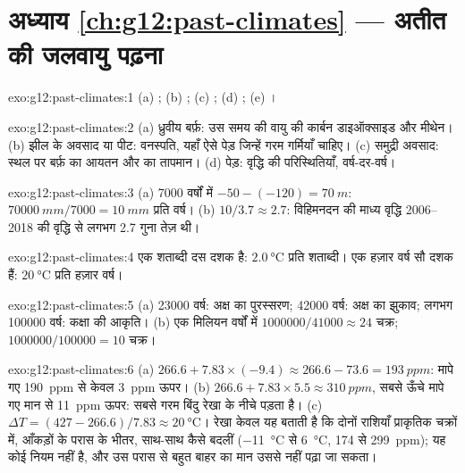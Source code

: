 \section*{अध्याय \ref{ch:g12:past-climates} --- अतीत की जलवायु पढ़ना}

\begin{solution}{exo:g12:past-climates:1}
(a) ; (b) ; (c) ; (d) ;
(e) ।
\end{solution}

\begin{solution}{exo:g12:past-climates:2}
(a) ध्रुवीय बर्फ़: उस समय की वायु की कार्बन डाइऑक्साइड और मीथेन।
(b) झील के अवसाद या पीट: वनस्पति, यहाँ ऐसे पेड़ जिन्हें गरम
गर्मियाँ चाहिए। (c) समुद्री अवसाद: स्थल पर बर्फ़ का आयतन और  का तापमान। (d) पेड़: वृद्धि की परिस्थितियाँ, वर्ष-दर-वर्ष।
\end{solution}

\begin{solution}{exo:g12:past-climates:3}
(a) \num{7000} वर्षों में $-50 - (-120) = \qty{70}{m}$: $\qty{70000}{mm}/\num{7000}
= \qty{10}{mm}$ प्रति वर्ष। (b) $10/3.7 \approx 2.7$: विहिमनदन की माध्य वृद्धि
2006--2018 की वृद्धि से लगभग 2.7 गुना तेज़ थी।
\end{solution}

\begin{solution}{exo:g12:past-climates:4}
एक शताब्दी दस दशक है: $\qty{2.0}{\degreeCelsius}$ प्रति शताब्दी। एक हज़ार
वर्ष सौ दशक हैं: $\qty{20}{\degreeCelsius}$ प्रति हज़ार वर्ष।
\end{solution}

\begin{solution}{exo:g12:past-climates:5}
(a) \num{23000} वर्ष: अक्ष का पुरस्सरण; \num{42000} वर्ष:
अक्ष का झुकाव; लगभग \num{100000} वर्ष: कक्षा की आकृति।
(b) एक मिलियन वर्षों में $\num{1000000}/\num{41000} \approx 24$ चक्र; $\num{1000000}/\num{100000}
= 10$ चक्र।
\end{solution}

\begin{solution}{exo:g12:past-climates:6}
(a) $266.6 + 7.83 \times (-9.4) \approx 266.6 - 73.6 = \qty{193}{ppm}$: मापे गए
\qty{190}{ppm} से केवल \qty{3}{ppm} ऊपर। (b) $266.6 + 7.83 \times 5.5
\approx \qty{310}{ppm}$, सबसे ऊँचे मापे गए मान से \qty{11}{ppm} ऊपर:
सबसे गरम बिंदु रेखा के नीचे पड़ता है। (c) $\Delta T = (427 - 266.6)/7.83 \approx
\qty{20}{\degreeCelsius}$। रेखा केवल यह बताती है कि दोनों राशियाँ प्राकृतिक चक्रों में,
आँकड़ों के परास के भीतर, साथ-साथ कैसे बदलीं
(\qty{-11}{\degreeCelsius} से \qty{+6}{\degreeCelsius}, 174 से
\qty{299}{ppm}); यह कोई नियम नहीं है, और उस परास से बहुत बाहर का मान
उससे नहीं पढ़ा जा सकता।
\end{solution}

